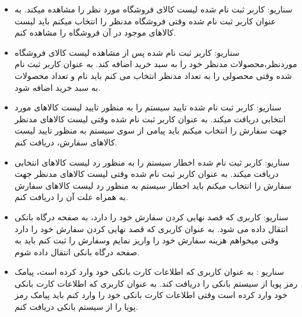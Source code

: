 \documentclass[14pt]{article}
\begin{document}
\begin{flushright}
\begin{itemize}
\item سناریو: کاربر ثبت نام شده لیست کالای فروشگاه مورد نظر را مشاهده میکند.
\newline
به عنوان کاربر ثبت نام شده
\newline
وقتی فروشگاه مدنظر را انتخاب میکنم
\newline
باید لیست کالاهای موجود در آن فروشگاه را مشاهده کنم.

\item سناریو: کاربر ثبت نام شده پس از مشاهده لیست کالای فروشگاه موردنظر،محصولات مدنظر خود را به سبد خرید اضافه کند.
\newline
به عنوان کاربر ثبت نام شده
\newline
وقتی محصولی را به تعداد مدنظر انتخاب می کنم
\newline
باید نام و تعداد محصولات به سبد خرید اضافه شود.


\item سناریو: کاربر ثبت نام شده تایید سیستم را به منظور تایید لیست کالاهای مورد انتخابی دریافت میکند.
\newline
به عنوان کاربر ثبت نام شده
\newline
وقتی لیست کالاهای مدنظر جهت سفارش را انتخاب میکنم
\newline
باید پیامی از سوی سیستم به منظور تایید لیست کالاهای سفارش، دریافت کنم. 


\item سناریو: کاربر ثبت نام شده اخطار سیستم را به منظور رد لیست کالاهای انتخابی دریافت میکند.
\newline
به عنوان کاربر ثبت نام شده
\newline
وقتی لیست کالاهای  مدنظر جهت سفارش را انتخاب میکنم
\newline
باید اخطار سیستم به منظور رد لیست کالاهای سفارش به همراه علت آن را دریافت کنم. 


\item سناریو: کاربری که قصد نهایی کردن سفارش خود را دارد، به صفحه درگاه بانکی انتقال داده می شود.
\newline
به عنوان کاربری که قصد نهایی کردن سفارش خود را دارد
\newline
وقتی میخواهم هزینه سفارش خود را واریز نمایم وسفارش را ثبت کنم
\newline
باید به صفحه درگاه بانکی انتقال داده شوم.

\item سناریو : به عنوان کاربری که اطلاعات کارت بانکی خود وارد کرده است، پیامک رمز پویا از سیستم بانکی را دریافت کند.
\newline
به عنوان کاربری که اطلاعات کارت بانکی خود وارد کرده است
\newline
وقتی اطلاعات کارت بانکی خود را وارد کنم 
\newline
باید پیامک رمز پویا را از سیستم بانکی دریافت کنم.


\end{itemize}
\end{flushright}
\end{document}
